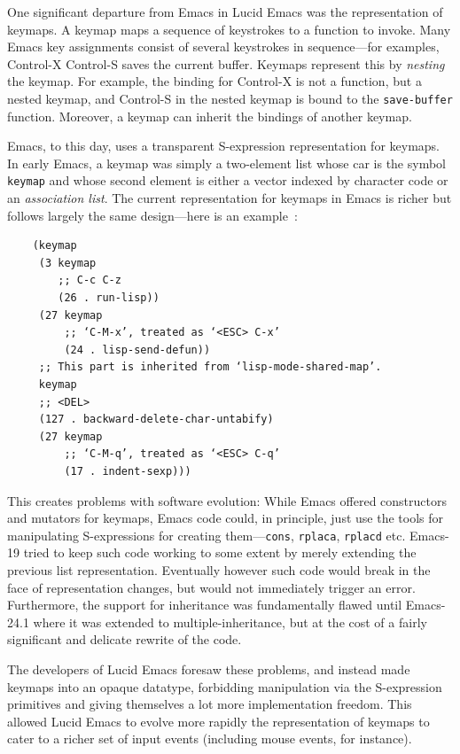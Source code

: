 \documentclass[format=acmsmall, review]{acmart}
\begin{document}
One significant departure from Emacs in Lucid Emacs was the
representation of keymaps.  A keymap maps a sequence of keystrokes to
a function to invoke.  Many Emacs key assignments consist of several
keystrokes in sequence---for examples, Control-X Control-S saves the
current buffer.  Keymaps represent this by \emph{nesting} the keymap.
For example, the binding for Control-X is not a function, but a nested
keymap, and Control-S in the nested keymap is bound to the
\texttt{save-buffer} function.  Moreover, a keymap can inherit the
bindings of another keymap.

Emacs, to this day, uses a transparent
S-expression representation for keymaps.
In early Emacs, a keymap was
simply a two-element list whose car is the symbol \texttt{keymap} and
whose second element is either a vector indexed by character code or an
\emph{association list}.
The current representation for keymaps in Emacs is richer but follows
largely the same design---here is an example~\cite{ELispManual2018}:
\begin{verbatim}
    (keymap
     (3 keymap
        ;; C-c C-z
        (26 . run-lisp))
     (27 keymap
         ;; ‘C-M-x’, treated as ‘<ESC> C-x’
         (24 . lisp-send-defun))
     ;; This part is inherited from ‘lisp-mode-shared-map’.
     keymap
     ;; <DEL>
     (127 . backward-delete-char-untabify)
     (27 keymap
         ;; ‘C-M-q’, treated as ‘<ESC> C-q’
         (17 . indent-sexp)))
\end{verbatim}
This creates problems with software evolution: While Emacs offered
constructors and mutators for keymaps, Emacs code could, in principle,
just use the tools for manipulating S-expressions for creating
them---\texttt{cons}, \texttt{rplaca}, \texttt{rplacd} etc.
Emacs-19 tried to keep such code working to some extent by merely
extending the previous list representation.
Eventually however such code would break in the face of representation
changes, but would not immediately trigger an error.  Furthermore, the
support for inheritance was fundamentally flawed until Emacs-24.1 where it
was extended to multiple-inheritance, but at the cost of a fairly significant
and delicate rewrite of the code.

The developers of Lucid Emacs foresaw these problems, and
instead made keymaps into an opaque datatype, forbidding manipulation via the
S-expression primitives and giving themselves a lot more implementation
freedom.  This allowed Lucid Emacs to evolve more rapidly the
representation of keymaps to cater to a richer set of input events
(including mouse events, for instance).
\end{document}
